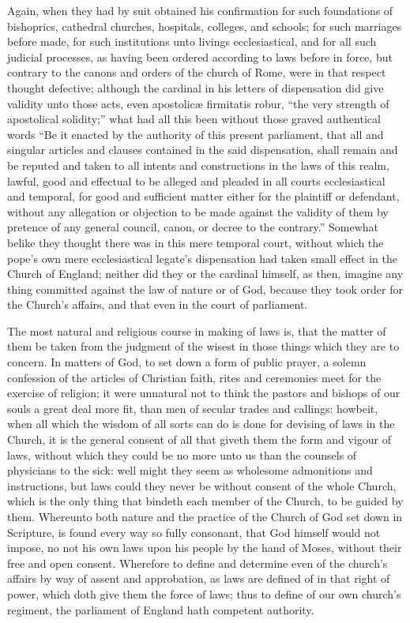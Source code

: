 Again, when they had by suit obtained his confirmation for such foundations of bishoprics, cathedral churches, hospitals, colleges, and schools; for such marriages before made, for such institutions unto livings ecclesiastical, and for all such judicial processes, as having been ordered according to laws before in force, but contrary to the canons and orders of the church of Rome, were in that respect thought defective; although the cardinal in his letters of dispensation did give validity unto those acts, even apostolicæ firmitatis robur, “the very strength of apostolical solidity;” what had all this been without those  graved authentical words “Be it enacted by the authority of this present parliament, that all and singular articles and clauses contained in the said dispensation, shall remain and be reputed and taken to all intents and constructions in the laws of this realm, lawful, good and effectual to be alleged and pleaded in all courts ecclesiastical and temporal, for good and sufficient matter either for the plaintiff or defendant, without any allegation or objection to be made against the validity of them by pretence of any general council, canon, or decree to the contrary.” Somewhat belike they thought there was in this mere temporal court, without which the pope’s own mere ecclesiastical legate’s dispensation had taken small effect in the Church of England; neither did they or the cardinal himself, as then, imagine any thing committed against the law of nature or of God, because they took order for the Church’s affairs, and that even in the court of parliament.

The most natural and religious course in making of laws is, that the matter of them be taken from the judgment of the wisest in those things which they are to concern. In matters of God, to set down a form of public prayer, a solemn confession of the articles of Christian faith, rites and ceremonies meet for the exercise of religion; it were unnatural not to think the pastors and bishops of our souls a great deal more fit, than men of secular trades and callings: howbeit, when all which the wisdom of all sorts can do is done for devising of laws in the Church, it is the general consent of all that giveth them the form and vigour of laws, without which they could be no more unto us than the counsels of physicians to the sick: well might they seem as wholesome admonitions and instructions, but laws could they never be without consent of the whole Church, which is the only thing that bindeth each member of the Church, to be guided by them. Whereunto both nature and the practice of the Church of God set down in Scripture, is found every way so fully consonant, that God himself would not impose, no not his own laws upon his people  by the hand of Moses, without their free and open consent. Wherefore to define and determine even of the church’s affairs by way of assent and approbation, as laws are defined of in that right of power, which doth give them the force of laws; thus to define of our own church’s regiment, the parliament of England hath competent authority.

